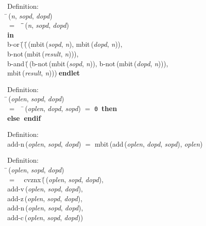 \begin{tabbing}{\sc Definition}: \\  
\=\,({\it{n\/}}, {\it{sopd\/}}, {\it{dopd\/}}) \\ 
$=$$\;\;\;\;$\=\=\,({\it{n\/}}, {\it{sopd\/}}, {\it{dopd\/}})\- \\ 
{\bf in} \\ 
{\rm{b-or}}\,(\=\,(\=\,({\rm{mbit}}\,({\it{sopd\/}}, {\it{n\/}}), {\rm{mbit}}\,({\it{dopd\/}}, {\it{n\/}})), \\ 
{\rm{b-not}}\,({\rm{mbit}}\,({\it{result\/}}, {\it{n\/}})))\-, \\ 
{\rm{b-and}}\,(\=\,({\rm{b-not}}\,({\rm{mbit}}\,({\it{sopd\/}}, {\it{n\/}})), {\rm{b-not}}\,({\rm{mbit}}\,({\it{dopd\/}}, {\it{n\/}}))), \\ 
{\rm{mbit}}\,({\it{result\/}}, {\it{n\/}}))\-)\-$\;${\bf  endlet}\-\-
\end{tabbing}

\begin{tabbing}{\sc Definition}: \\  
\=\,({\it{oplen\/}}, {\it{sopd\/}}, {\it{dopd\/}}) \\ 
$=$$\;\;\;\;$\=\,({\it{oplen\/}}, {\it{dopd\/}}, {\it{sopd\/}}) $=$ {\tt{0}}$\;\;${\bf then }{} \\ 
{\bf else }{}$\;${\bf  endif}\-\-
\end{tabbing}

\begin{tabbing}{\sc Definition}: \\  
{\rm{add-n}}\,({\it{oplen\/}}, {\it{sopd\/}}, {\it{dopd\/}}) $=$ {\rm{mbit}}\,({\rm{add}}\,({\it{oplen\/}}, {\it{dopd\/}}, {\it{sopd\/}}), {\it{oplen\/}})
\end{tabbing}

\begin{tabbing}{\sc Definition}: \\  
\=\,({\it{oplen\/}}, {\it{sopd\/}}, {\it{dopd\/}}) \\ 
$=$$\;\;\;\;${\rm{cvznx}}\,(\=\,({\it{oplen\/}}, {\it{sopd\/}}, {\it{dopd\/}}), \\ 
{\rm{add-v}}\,({\it{oplen\/}}, {\it{sopd\/}}, {\it{dopd\/}}), \\ 
{\rm{add-z}}\,({\it{oplen\/}}, {\it{sopd\/}}, {\it{dopd\/}}), \\ 
{\rm{add-n}}\,({\it{oplen\/}}, {\it{sopd\/}}, {\it{dopd\/}}), \\ 
{\rm{add-c}}\,({\it{oplen\/}}, {\it{sopd\/}}, {\it{dopd\/}}))\-\-
\end{tabbing}

